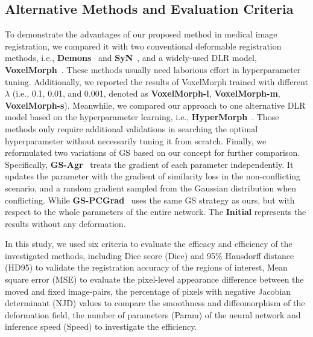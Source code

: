 \documentclass[runningheads]{llncs}
\begin{document}
\subsection{Alternative Methods and Evaluation Criteria}
To demonstrate the advantages of our proposed method in medical image registration, we compared it with two conventional deformable registration methods, i.e., \textbf{Demons}~\cite{vercauteren2009diffeomorphic} and \textbf{SyN}~\cite{avants2008symmetric}, and a widely-used DLR model, \textbf{VoxelMorph}~\cite{dalca2018unsupervised}. These methods usually need laborious effort in hyperparameter tuning. Additionally, we reported the results of VoxelMorph trained with different $\lambda$ (i.e., 0.1, 0.01, and 0.001, denoted as \textbf{VoxelMorph-l}, \textbf{VoxelMorph-m}, \textbf{VoxelMorph-s}). Meanwhile, we compared our approach to one alternative DLR model based on the hyperparameter learning, i.e., \textbf{HyperMorph}~\cite{hoopes2021hypermorph}. Those methods only require additional validations in searching the optimal hyperparameter without necessarily tuning it from scratch. Finally, we reformulated two variations of GS based on our concept for further comparison. Specifically, \textbf{GS-Agr}~\cite{mansilla2021domain} treats the gradient of each parameter independently. It updates the parameter with the gradient of similarity loss in the non-conflicting scenario, and a random gradient sampled from the Gaussian distribution when conflicting. While \textbf{GS-PCGrad}~\cite{yu2020gradient} uses the same GS strategy as ours, but with respect to the whole parameters of the entire network. The \textbf{Initial} represents the results without any deformation.

In this study, we used six criteria to evaluate the efficacy and efficiency of the investigated methods, including Dice score (Dice) and 95$\%$ Hausdorff distance (HD95) to validate the registration accuracy of the regions of interest, Mean square error (MSE) to evaluate the pixel-level appearance difference between the moved and fixed image-pairs, the percentage of pixels with negative Jacobian determinant (NJD) values to compare the smoothness and diffeomorphism of the deformation field, the number of parameters (Param) of the neural network and inference speed (Speed) to investigate the efficiency.
\end{document}
